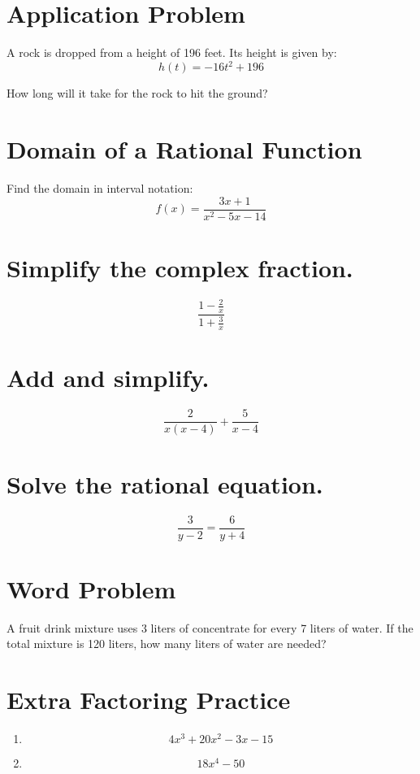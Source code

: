 \documentclass[12pt]{article}
\begin{document}
\section*{Application Problem}

A rock is dropped from a height of 196 feet. Its height is given by:
\[
h(t)=-16t^2+196
\]

How long will it take for the rock to hit the ground?

\section*{Domain of a Rational Function}

Find the domain in interval notation:
\[
f(x)=\frac{3x+1}{x^2-5x-14}
\]

\section*{Simplify the complex fraction.}

\[
\frac{1-\frac{2}{x}}{1+\frac{3}{x}}
\]

\section*{Add and simplify.}

\[
\frac{2}{x(x-4)}+\frac{5}{x-4}
\]

\section*{Solve the rational equation.}

\[
\frac{3}{y-2}=\frac{6}{y+4}
\]

\section*{Word Problem}

A fruit drink mixture uses 3 liters of concentrate for every 7 liters of water. If the total mixture is 120 liters, how many liters of water are needed?

\vspace{1em}

\section*{Extra Factoring Practice}

\begin{enumerate}
\item
\[
4x^3+20x^2-3x-15
\]

\item
\[
18x^4-50
\]
\end{enumerate}
\end{document}

